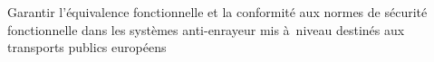 Garantir l’équivalence fonctionnelle et la conformité aux normes de sécurité fonctionnelle dans les systèmes anti-enrayeur mis à~niveau destinés aux transports publics européens